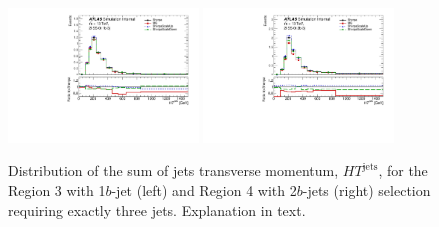 \begin{figure}[!htb]
\centering
\includegraphics[width=0.45\textwidth]{Plots/ttV/generator/c_Region_2_HT_jets}
\includegraphics[width=0.45\textwidth]{Plots/ttV/generator/c_Region_3_HT_jets}\\
  \caption{Distribution of the sum of jets transverse momentum, $HT^{\text{jets}}$, for the Region 3 with 1$b$-jet (left) and Region 4 with 2$b$-jets (right) selection requiring exactly three jets. Explanation in text. \label{ttV:3j12b}}
\end{figure}


